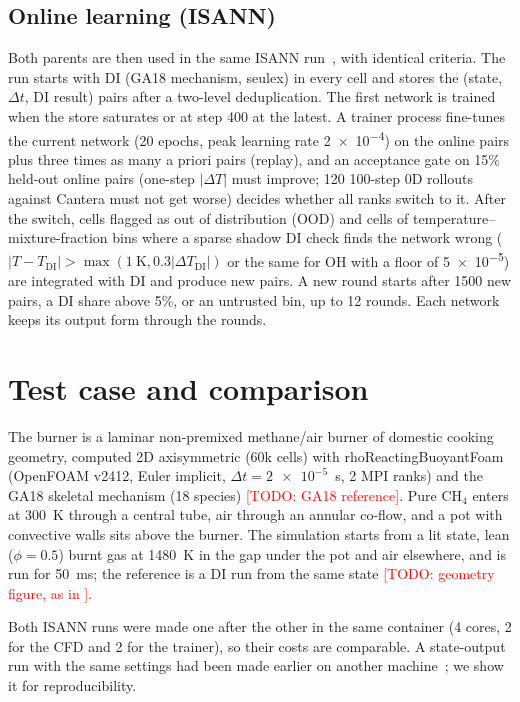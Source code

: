 \documentclass[preprint,review,12pt]{elsarticle}
\newcommand{\todo}[1]{\textcolor{red}{[TODO: #1]}}
\begin{document}
\subsection{Online learning (ISANN)}
Both parents are then used in the same ISANN run~\cite{isann2026}, with identical criteria. The run
starts with DI (GA18 mechanism, seulex) in every cell and stores the (state, $\Delta t$, DI result)
pairs after a two-level deduplication. The first network is trained when the store saturates or at
step 400 at the latest. A trainer process fine-tunes the current network (20 epochs, peak learning rate
\num{2e-4}) on the online pairs plus three times as many a priori pairs (replay), and an acceptance gate
on 15\% held-out online pairs (one-step $|\Delta T|$ must improve; 120 100-step 0D rollouts against
Cantera must not get worse) decides whether all ranks switch to it. After the switch, cells flagged as
out of distribution (OOD) and cells of temperature--mixture-fraction bins where a sparse shadow DI
check finds the network wrong ($|T-T_\mathrm{DI}|>\max(1~\mathrm{K},0.3|\Delta T_\mathrm{DI}|)$ or the same
for OH with a floor of \num{5e-5}) are integrated with DI and produce new pairs. A new round starts
after 1500 new pairs, a DI share above 5\%, or an untrusted bin, up to 12 rounds. Each network keeps its
output form through the rounds.

\section{Test case and comparison}
\label{sec:case}

The burner is a laminar non-premixed methane/air burner of domestic cooking geometry, computed
2D axisymmetric (60k cells) with rhoReactingBuoyantFoam (OpenFOAM v2412, Euler implicit,
$\Delta t=\num{2e-5}$~s, 2 MPI ranks) and the GA18 skeletal mechanism (18 species) \todo{GA18 reference}.
Pure CH$_4$ enters at 300~K through a central tube, air through an annular co-flow, and a pot with
convective walls sits above the burner. The simulation starts from a lit state, lean ($\phi=0.5$)
burnt gas at 1480~K in the gap under the pot and air elsewhere, and is run for 50~ms; the reference is
a DI run from the same state \todo{geometry figure, as in \cite{isann2026}}.

Both ISANN runs were made one after the other in the same container (4 cores, 2 for the CFD and 2 for
the trainer), so their costs are comparable. A state-output run with the same settings had been made
earlier on another machine~\cite{isann2026}; we show it for reproducibility.
\end{document}
